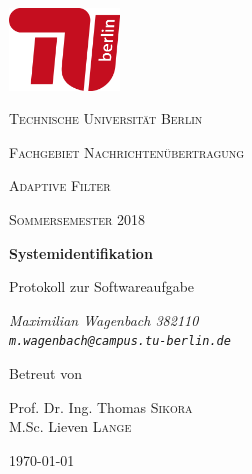 \begin{titlepage}
    \centering
    \includegraphics[height=62pt]{tu_red.png}\par
    {\scshape\huge Technische Universität Berlin \par}
    {\scshape\Large Fachgebiet Nachrichtenübertragung\par}
    \vspace{1.5cm}
    {\scshape\LARGE Adaptive Filter\par}
    {\scshape\small Sommersemester 2018\par}
    \vspace{1.5cm}

    {\Huge\bfseries {Systemidentifikation}\par}
    \vspace{0.1cm}
    {\large Protokoll zur Softwareaufgabe\par}
    \vspace{3cm}

    {\itshape
          Maximilian Wagenbach 382110 \\
          \vspace{0.2cm}
          \small \texttt{m.wagenbach@campus.tu-berlin.de}
    }
    \vfill
    
    Betreut von\par
    Prof. Dr. Ing. Thomas \textsc{Sikora} \\
    M.Sc. Lieven \textsc{Lange}
    \vspace{1cm}
    
    {\large \today\par}
\end{titlepage}